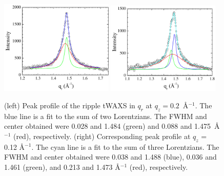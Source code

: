 \begin{figure}[htbp]
  \centering
  \includegraphics[width=0.48\textwidth]{figures/ripple/tWAXS/twaxs_ripple_qr_strong}
  \includegraphics[width=0.48\textwidth]{figures/ripple/tWAXS/twaxs_weak_qr_tripleLorentz}
  \caption[(left) Peak profile of the ripple tWAXS in $q_r$ at $q_z=0.2$~\AA$^{-1}$]
  {(left) Peak profile of the ripple tWAXS in $q_r$ at $q_z=0.2$~\AA$^{-1}$.
  The blue line is a fit to the sum of two Lorentzians.
  The FWHM and center obtained were 0.028 and 1.484 (green) and
  0.088 and 1.475~\AA$^{-1}$ (red), respectively.
  (right) Corresponding peak profile at $q_z$ = 0.12 \AA$^{-1}$.
  The cyan line is a fit to the sum of three Lorentzians. 
  The FWHM and center obtained were 0.038 and 1.488 (blue),
  0.036 and 1.461 (green), and
  0.213 and 1.473 \AA$^{-1}$ (red), respectively.}
  \label{fig:twaxs_weak_qr}
\end{figure}

